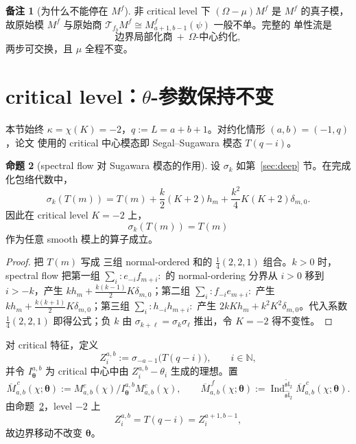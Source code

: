 \documentclass[UTF8,11pt]{ctexart}
\newcommand{\N}{\mathbb N}
\newcommand{\slh}{\widehat{\mathfrak{sl}}_2}
\newcommand{\slt}{\widetilde{\mathfrak{sl}}_2}
\newcommand{\Ind}{\operatorname{Ind}}
\newcommand{\T}{\mathcal T}
\theoremstyle{definition}
\newtheorem{proposition}{命题}[section]
\newtheorem{remark}[proposition]{备注}
\begin{document}
\begin{remark}[为什么不能停在 \(M^f\)]\label{rem:omega}
非 critical level 下 \((\Omega-\mu)M^f\) 是 \(M^f\) 的真子模，故原始模
\(M^f\) 与原始商 \(\T_{f_b}M^f\cong M^f_{a+1,b-1}(\psi)\) 一般不单。完整的
单性流是
\[
\boxed{\ \text{边界局部化商}\ +\ \Omega\text{-中心约化},\ }
\]
两步可交换，且 \(\mu\) 全程不变。
\end{remark}

\section{critical level：\(\theta\)-参数保持不变}\label{sec:critical}

本节始终 \(\kappa=\chi(K)=-2\)，\(q:=L=a+b+1\)。对约化情形
\((a,b)=(-1,q)\)，论文 \cite{FGXZ} 使用的 critical 中心模态即
Segal--Sugawara 模态 \(T(q-i)\)。

\begin{proposition}[spectral flow 对 Sugawara 模态的作用]\label{prop:spectral}
设 \(\sigma_k\) 如第~\ref{sec:deep} 节。在完成化包络代数中，
\[
\boxed{\ \sigma_k(T(m))
=T(m)+\frac{k}{2}(K+2)h_m+\frac{k^2}{4}K(K+2)\delta_{m,0}.\ }
\]
因此在 critical level \(K=-2\) 上，
\[
\boxed{\ \sigma_k(T(m))=T(m)\ }
\]
作为任意 smooth 模上的算子成立。
\end{proposition}

\begin{proof}
把 \(T(m)\) 写成 \cite[公式 (2.3)]{FGXZ} 三组 normal-ordered 和的
\(\tfrac14(2,2,1)\) 组合。\(k>0\) 时，spectral flow 把第一组
\(\sum_i:e_{-i}f_{m+i}:\) 的 normal-ordering 分界从 \(i>0\) 移到
\(i>-k\)，产生 \(kh_m+\tfrac{k(k-1)}{2}K\delta_{m,0}\)；第二组
\(\sum_i:f_{-i}e_{m+i}:\) 产生
\(kh_m+\tfrac{k(k+1)}{2}K\delta_{m,0}\)；第三组
\(\sum_i:h_{-i}h_{m+i}:\) 产生 \(2kKh_m+k^2K^2\delta_{m,0}\)。代入系数
\(\tfrac14(2,2,1)\) 即得公式；负 \(k\) 由
\(\sigma_{k+\ell}=\sigma_k\sigma_\ell\) 推出，令 \(K=-2\) 得不变性。
\end{proof}

对 critical 特征，定义
\[
Z_i^{a,b}:=\sigma_{-a-1}\bigl(T(q-i)\bigr),\qquad i\in\N,
\]
并令 \(I^{a,b}_{\boldsymbol\theta}\) 为 critical 中心中由
\(Z_i^{a,b}-\theta_i\) 生成的理想。置
\[
\overline M^{\,c}_{a,b}(\chi;\boldsymbol\theta)
:=M^c_{a,b}(\chi)/I^{a,b}_{\boldsymbol\theta}M^c_{a,b}(\chi),
\qquad
\overline M^{\,f}_{a,b}(\chi;\boldsymbol\theta)
:=\Ind_{\slh}^{\slt}\overline M^{\,c}_{a,b}(\chi;\boldsymbol\theta).
\]
由命题~\ref{prop:spectral}，level \(-2\) 上
\[
Z_i^{a,b}=T(q-i)=Z_i^{a+1,b-1},
\]
故边界移动不改变 \(\boldsymbol\theta\)。
\end{document}
